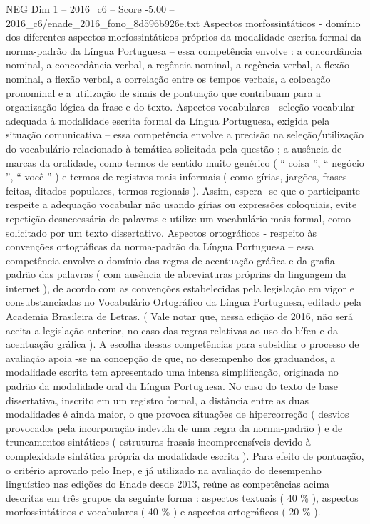 \begin{textsample}{NEG Dim 1 – 2016\_c6 – Score -5.00 – 2016\_c6/enade\_2016\_fono\_8d596b926e.txt}
Aspectos morfossintáticos - domínio dos diferentes aspectos morfossintáticos próprios da modalidade escrita formal da norma-padrão da Língua Portuguesa – essa competência envolve : a concordância nominal, a concordância verbal, a regência nominal, a regência verbal, a flexão nominal, a flexão verbal, a correlação entre os tempos verbais, a colocação pronominal e a utilização de sinais de pontuação que contribuam para a organização lógica da frase e do texto.
Aspectos vocabulares - seleção vocabular adequada à modalidade escrita formal da Língua Portuguesa, exigida pela situação comunicativa – essa competência envolve a precisão na seleção/utilização do vocabulário relacionado à temática solicitada pela questão ; a ausência de marcas da oralidade, como termos de sentido muito genérico ( “ coisa ”, “ negócio ”, “ você ” ) e termos de registros mais informais ( como gírias, jargões, frases feitas, ditados populares, termos regionais ).
Assim, espera -se que o participante respeite a adequação vocabular não usando gírias ou expressões coloquiais, evite repetição desnecessária de palavras e utilize um vocabulário mais formal, como solicitado por um texto dissertativo.
Aspectos ortográficos - respeito às convenções ortográficas da norma-padrão da Língua Portuguesa – essa competência envolve o domínio das regras de acentuação gráfica e da grafia padrão das palavras ( com ausência de abreviaturas próprias da linguagem da internet ), de acordo com as convenções estabelecidas pela legislação em vigor e consubstanciadas no Vocabulário Ortográfico da Língua Portuguesa, editado pela Academia Brasileira de Letras. ( Vale notar que, nessa edição de 2016, não será aceita a legislação anterior, no caso das regras relativas ao uso do hífen e da acentuação gráfica ).
A escolha dessas competências para subsidiar o processo de avaliação apoia -se na concepção de que, no desempenho dos graduandos, a modalidade escrita tem apresentado uma intensa simplificação, originada no padrão da modalidade oral da Língua Portuguesa.
No caso do texto de base dissertativa, inscrito em um registro formal, a distância entre as duas modalidades é ainda maior, o que provoca situações de hipercorreção ( desvios provocados pela incorporação indevida de uma regra da norma-padrão ) e de truncamentos sintáticos ( estruturas frasais incompreensíveis devido à complexidade sintática própria da modalidade escrita ).
Para efeito de pontuação, o critério aprovado pelo Inep, e já utilizado na avaliação do desempenho linguístico nas edições do Enade desde 2013, reúne as competências acima descritas em três grupos da seguinte forma : aspectos textuais ( 40 \% ), aspectos morfossintáticos e vocabulares ( 40 \% ) e aspectos ortográficos ( 20 \% ).

\end{textsample}
